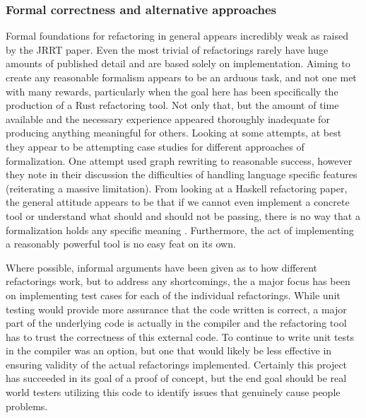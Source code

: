 
\subsubsection{Formal correctness and alternative approaches}
Formal foundations for refactoring in general appears incredibly weak as raised by the JRRT paper. Even the most trivial of refactorings rarely have huge amounts of published detail and are based solely on implementation. Aiming to create any reasonable formalism appears to be an arduous task, and not one met with many rewards, particularly when the goal here has been specifically the production of a Rust refactoring tool. Not only that, but the amount of time available and the necessary experience appeared thoroughly inadequate for producing anything meaningful for others. Looking at some attempts, at best they appear to be attempting case studies for different approaches of formalization. One attempt used graph rewriting \cite{graph} to reasonable success, however they note in their discussion the difficulties of handling language specific features (reiterating a massive limitation). From looking at a Haskell refactoring paper, the general attitude appears to be that if we cannot even implement a concrete tool or understand what should and should not be passing, there is no way that a formalization holds any specific meaning \cite{sculthorpe}. Furthermore, the act of implementing a reasonably powerful tool is no easy feat on its own. 


Where possible, informal arguments have been given as to how different refactorings work, but to address any shortcomings, the a major focus has been on implementing test cases for each of the individual refactorings. While unit testing would provide more assurance that the code written is correct, a major part of the underlying code is actually in the compiler and the refactoring tool has to trust the correctness of this external code. To continue to write unit tests in the compiler was an option, but one that would likely be less effective in ensuring validity of the actual refactorings implemented. Certainly this project has succeeded in its goal of a proof of concept, but the end goal should be real world testers utilizing this code to identify issues that genuinely cause people problems.

